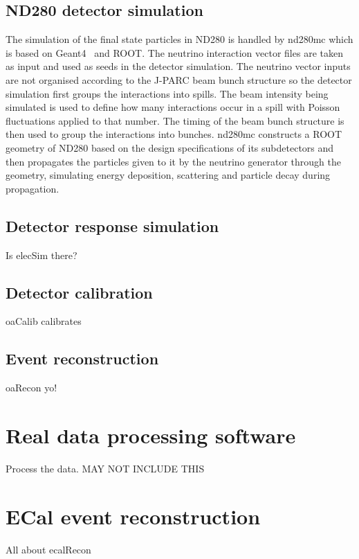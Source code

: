 \subsection{ND280 detector simulation}
\label{subsec:ND280DetectorSimulation}
The simulation of the final state particles in ND280 is handled by nd280mc which is based on Geant4~\cite{Agostinelli2003250} and ROOT.  The neutrino interaction vector files are taken as input and used as seeds in the detector simulation.  The neutrino vector inputs are not organised according to the J-PARC beam bunch structure so the detector simulation first groups the interactions into spills.  The beam intensity being simulated is used to define how many interactions occur in a spill with Poisson fluctuations applied to that number.  The timing of the beam bunch structure is then used to group the interactions into bunches. 
\newline
nd280mc constructs a ROOT geometry of ND280 based on the design specifications of its subdetectors and then propagates the particles given to it by the neutrino generator through the geometry, simulating energy deposition, scattering and particle decay during propagation.

\subsection{Detector response simulation}
\label{subsec:DetectorResponseSimulation}
Is elecSim there?

\subsection{Detector calibration}
\label{subsec:DetectorCalibration}
oaCalib calibrates

\subsection{Event reconstruction}
\label{subsec:EventReconstruction}
oaRecon yo!


\section{Real data processing software}
\label{sec:datachain}
Process the data.  MAY NOT INCLUDE THIS


\section{ECal event reconstruction}
\label{sec:ECalEventReconstruction}
All about ecalRecon

